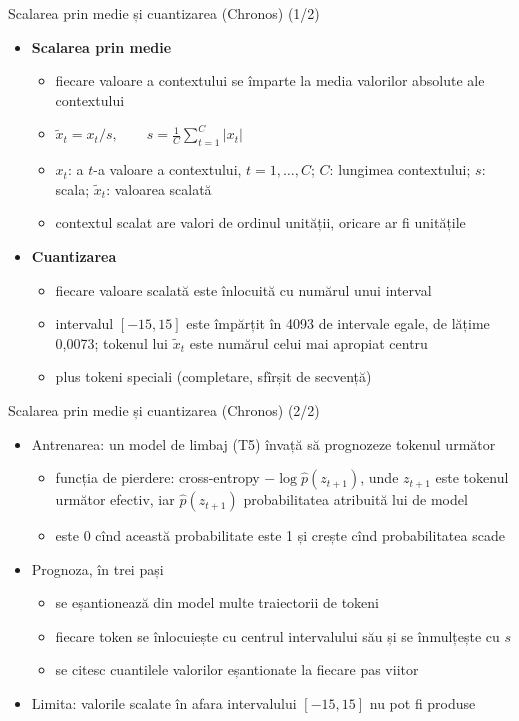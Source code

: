 \begin{frame}{Scalarea prin medie și cuantizarea (Chronos) (1/2)}
\itemsize{\footnotesize}
\begin{itemize}
    \item \textbf{Scalarea prin medie}
    \begin{itemize}
        \item fiecare valoare a contextului se împarte la media valorilor absolute ale contextului
        \item $\tilde x_t = x_t / s, \qquad s = \frac{1}{C}\sum_{t=1}^{C} |x_t|$
        \item $x_t$: a $t$-a valoare a contextului, $t = 1, \dots, C$; $C$: lungimea contextului; $s$: scala; $\tilde x_t$: valoarea scalată
        \item contextul scalat are valori de ordinul unității, oricare ar fi unitățile
    \end{itemize}
    \item \textbf{Cuantizarea}
    \begin{itemize}
        \item fiecare valoare scalată este înlocuită cu numărul unui interval
        \item intervalul $[-15, 15]$ este împărțit în 4093 de intervale egale, de lățime 0{,}0073; tokenul lui $\tilde x_t$ este numărul celui mai apropiat centru
        \item plus tokeni speciali (completare, sfîrșit de secvență)
    \end{itemize}
\end{itemize}
\end{frame}

\begin{frame}{Scalarea prin medie și cuantizarea (Chronos) (2/2)}
\itemsize{\small}
\begin{itemize}
    \item Antrenarea: un model de limbaj (T5) învață să prognozeze tokenul următor
    \begin{itemize}
        \item funcția de pierdere: cross-entropy $-\log \hat p(z_{t+1})$, unde $z_{t+1}$ este tokenul următor efectiv, iar $\hat p(z_{t+1})$ probabilitatea atribuită lui de model
        \item este 0 cînd această probabilitate este 1 și crește cînd probabilitatea scade
    \end{itemize}
    \item Prognoza, în trei pași
    \begin{itemize}
        \item se eșantionează din model multe traiectorii de tokeni
        \item fiecare token se înlocuiește cu centrul intervalului său și se înmulțește cu $s$
        \item se citesc cuantilele valorilor eșantionate la fiecare pas viitor
    \end{itemize}
    \item Limita: valorile scalate în afara intervalului $[-15, 15]$ nu pot fi produse
\end{itemize}
\end{frame}

